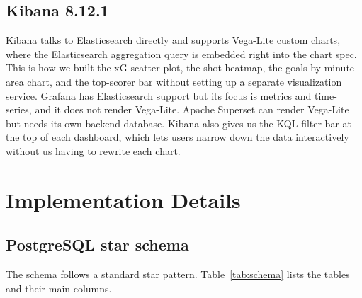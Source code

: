 \documentclass[conference]{IEEEtran}
\begin{document}
\subsection{Kibana 8.12.1}

Kibana talks to Elasticsearch directly and supports Vega-Lite custom charts,
where the Elasticsearch aggregation query is embedded right into the chart
spec. This is how we built the xG scatter plot, the shot heatmap, the
goals-by-minute area chart, and the top-scorer bar without setting up a
separate visualization service. Grafana has Elasticsearch support but its
focus is metrics and time-series, and it does not render Vega-Lite. Apache
Superset can render Vega-Lite but needs its own backend database. Kibana also
gives us the KQL filter bar at the top of each dashboard, which lets users
narrow down the data interactively without us having to rewrite each chart.


\section{Implementation Details}

\subsection{PostgreSQL star schema}

The schema follows a standard star pattern. Table~\ref{tab:schema} lists the
tables and their main columns.
\end{document}
